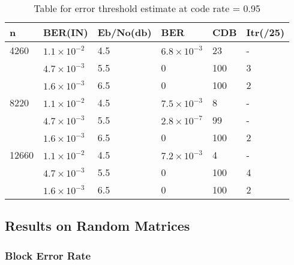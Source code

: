 \begin{table}[H]
\centering
\caption[Table for error threshold estimate at code rate = 0.95, Min Sum decode using quasi cyclic matrix]{Table for error threshold estimate at code rate = 0.95}
\begin{tabular}{|l|l|l|l|l|l|}
\hline
n     & BER(IN)& Eb/No(db) & BER    & CDB & Itr(/25) \\ \hline
4260  & $1.1\times10^{-2}$ & 4.5   & $6.8\times10^{-3}$      & 23 &  -       \\ 
      & $4.7\times10^{-3}$ & 5.5   & 0           & 100 & 3         \\  
      & $1.6\times10^{-3}$ & 6.5   & 0           & 100 & 2         \\ \hline
8220  & $1.1\times10^{-2}$ & 4.5   & $7.5\times10^{-3}$      & 8 & -         \\ 
      & $4.7\times10^{-3}$ & 5.5   & $2.8\times10^{-7}$      & 99 & -         \\ 
      & $1.6\times10^{-3}$ & 6.5   & 0      & 100 & 2         \\ \hline
12660 & $1.1\times10^{-2}$ & 4.5   & $7.2\times10^{-3}$      & 4 & -        \\ 
      & $4.7\times10^{-3}$ & 5.5   & 0      & 100 & 4         \\ 
      & $1.6\times10^{-3}$ & 6.5   & 0      & 100 & 2         \\ \hline      
\end{tabular}
\label{tab:nameForThisTable}
\end{table}

\subsection{Results on Random Matrices }
\subsubsection{Block Error Rate }

